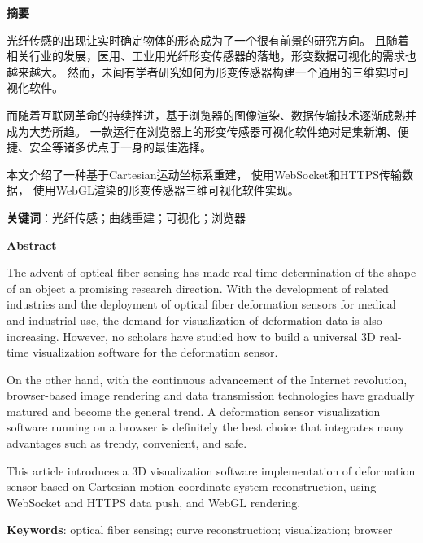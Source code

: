 \clearpage
\begin{center}
    \bfseries {} 摘要
\end{center}

光纤传感的出现让实时确定物体的形态成为了一个很有前景的研究方向。
且随着相关行业的发展，医用、工业用光纤形变传感器的落地，形变数据可视化的需求也越来越大。
然而，未闻有学者研究如何为形变传感器构建一个通用的三维实时可视化软件。

而随着互联网革命的持续推进，基于浏览器的图像渲染、数据传输技术逐渐成熟并成为大势所趋。
一款运行在浏览器上的形变传感器可视化软件绝对是集新潮、便捷、安全等诸多优点于一身的最佳选择。

本文介绍了一种基于Cartesian运动坐标系重建，
使用WebSocket和HTTPS传输数据，
使用WebGL渲染的形变传感器三维可视化软件实现。

\textbf{关键词}：光纤传感；曲线重建；可视化；浏览器

\clearpage{}

\begin{center}
    \bfseries {} Abstract
\end{center}

The advent of optical fiber sensing has made real-time determination of the shape of an object a promising research direction. 
With the development of related industries and the deployment of optical fiber deformation sensors for medical and industrial use, 
the demand for visualization of deformation data is also increasing. 
However, no scholars have studied how to build a universal 3D real-time visualization software for the deformation sensor.

On the other hand, with the continuous advancement of the Internet revolution, 
browser-based image rendering and data transmission technologies have gradually matured and become the general trend. 
A deformation sensor visualization software running on a browser is definitely the best choice that integrates many advantages such as trendy, convenient, and safe.

This article introduces a 3D visualization software implementation of deformation sensor 
based on Cartesian motion coordinate system reconstruction, using WebSocket and HTTPS data push, and WebGL rendering.

\textbf{Keywords}: optical fiber sensing; curve reconstruction; visualization; browser
